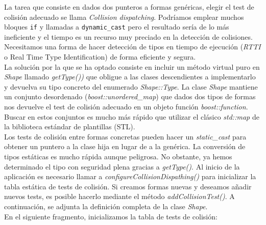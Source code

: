 La tarea que consiste en dados dos punteros a formas genéricas, elegir
el test de colisión adecuado se llama \textit{Collision dispatching}.
Podríamos emplear muchos bloques \texttt{if} y llamadas a \texttt{dynamic\_cast}
\cite{gera09} pero el resultado sería de lo más ineficiente y el tiempo es
un recurso muy preciado en la detección de colisiones. Necesitamos una forma
de hacer detección de tipos en tiempo de ejecución (\textit{RTTI} o Real Time
Type Identification) de forma eficiente y segura.\\

La solución por la que se ha optado consiste en incluir un método virtual
puro en \textit{Shape} llamado \textit{getType())} que obligue a las clases
descendientes a implementarlo y devuelva su tipo concreto del enumerado
\textit{Shape::Type}. La clase \textit{Shape} mantiene un conjunto
desordenado (\textit{boost::unordered\_map}) \cite{website:boost}
que dados dos tipos de formas nos devuelve el test de colisión adecuado
en un objeto función \textit{boost::function}.
Buscar en estos conjuntos es mucho más rápido que utilizar el clásico \textit{std::map}
de la biblioteca estándar de plantillas (STL).\\

Los tests de colisión entre formas concretas pueden hacer un \textit{static\_cast}
para obtener un puntero a la clase hija en lugar de a la genérica. La conversión
de tipos estáticas es mucho rápida aunque peligrosa. No obstante, ya hemos determinado
el tipo con seguridad plena gracias a \textit{getType()}. Al inicio de la aplicación
es necesario llamar a \textit{configureCollisionDispathing()} para inicializar
la tabla estática de tests de colisión. Si creamos formas nuevas y deseamos
añadir nuevos tests, es posible hacerlo mediante el método \textit{addCollisionTest()}.
A continuación, se adjunta la definición completa de la clase \textit{Shape}.\\



En el siguiente fragmento, inicializamos la tabla de tests de colisión:\\


